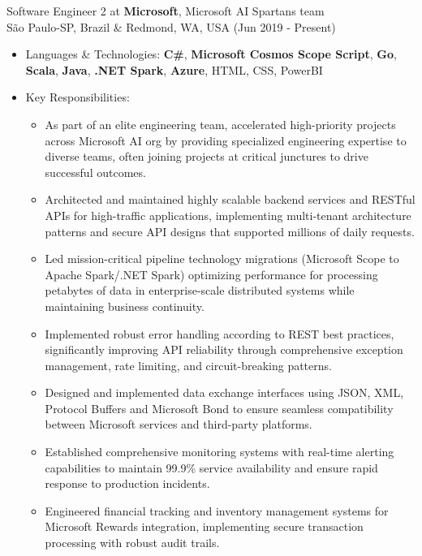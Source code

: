 
\normalsize{Software Engineer 2 at \textbf{Microsoft}, Microsoft AI Spartans team}\\
        \scriptsize{São Paulo-SP, Brazil \& Redmond, WA, USA (Jun 2019 - Present)}
\begin{itemize}
    \item \footnotesize{Languages \& Technologies:}\scriptsize{ \textbf{C\#}, \textbf{Microsoft Cosmos Scope Script}, \textbf{Go}, \textbf{Scala}, \textbf{Java}, \textbf{.NET Spark}, \textbf{Azure}, HTML, CSS, PowerBI}
    \item \footnotesize{Key Responsibilities:}
    \begin{itemize}
        \item \scriptsize{As part of an elite engineering team, accelerated high-priority projects across Microsoft AI org by providing specialized engineering expertise to diverse teams, often joining projects at critical junctures to drive successful outcomes.}
        \item \scriptsize{Architected and maintained highly scalable backend services and RESTful APIs for high-traffic applications, implementing multi-tenant architecture patterns and secure API designs that supported millions of daily requests.}
        \item \scriptsize{Led mission-critical pipeline technology migrations (Microsoft Scope to Apache Spark/.NET Spark) optimizing performance for processing petabytes of data in enterprise-scale distributed systems while maintaining business continuity.}
        \item \scriptsize{Implemented robust error handling according to REST best practices, significantly improving API reliability through comprehensive exception management, rate limiting, and circuit-breaking patterns.}
        \item \scriptsize{Designed and implemented data exchange interfaces using JSON, XML, Protocol Buffers and Microsoft Bond to ensure seamless compatibility between Microsoft services and third-party platforms.}
        \item \scriptsize{Established comprehensive monitoring systems with real-time alerting capabilities to maintain 99.9\% service availability and ensure rapid response to production incidents.}
        \item \scriptsize{Engineered financial tracking and inventory management systems for Microsoft Rewards integration, implementing secure transaction processing with robust audit trails.}

\end{itemize}
\end{itemize}
